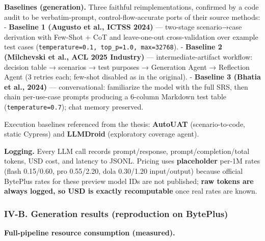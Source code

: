 \documentclass[
]{article}
\begin{document}
\textbf{Baselines (generation).} Three faithful reimplementations,
confirmed by a code audit to be verbatim-prompt, control-flow-accurate
ports of their source methods: - \textbf{Baseline 1 (Augusto et al.,
ICTSS 2024)} --- two-stage scenario→case derivation with Few-Shot + CoT
and leave-one-out cross-validation over example test cases
(\texttt{temperature=0.1,\ top\_p=1.0,\ max=32768}). - \textbf{Baseline
2 (Milchevski et al., ACL 2025 Industry)} --- intermediate-artifact
workflow: decision table → scenarios → test purposes → Generation Agent
→ Reflection Agent (3 retries each; few-shot disabled as in the
original). - \textbf{Baseline 3 (Bhatia et al., 2024)} ---
conversational: familiarize the model with the full SRS, then chain
per-use-case prompts producing a 6-column Markdown test table
(\texttt{temperature=0.7}); chat memory preserved.

Execution baselines referenced from the thesis: \textbf{AutoUAT}
(scenario-to-code, static Cypress) and \textbf{LLMDroid} (exploratory
coverage agent).

\textbf{Logging.} Every LLM call records prompt/response,
prompt/completion/total tokens, USD cost, and latency to JSONL. Pricing
uses \textbf{placeholder} per-1M rates (flash 0.15/0.60, pro 0.55/2.20,
dola 0.30/1.20 input/output) because official BytePlus rates for these
preview model IDs are not published; \textbf{raw tokens are always
logged, so USD is exactly recomputable} once real rates are known.

\subsubsection{IV-B. Generation results (reproduction on
BytePlus)}\label{iv-b.-generation-results-reproduction-on-byteplus}

\textbf{Full-pipeline resource consumption (measured).}
\end{document}
